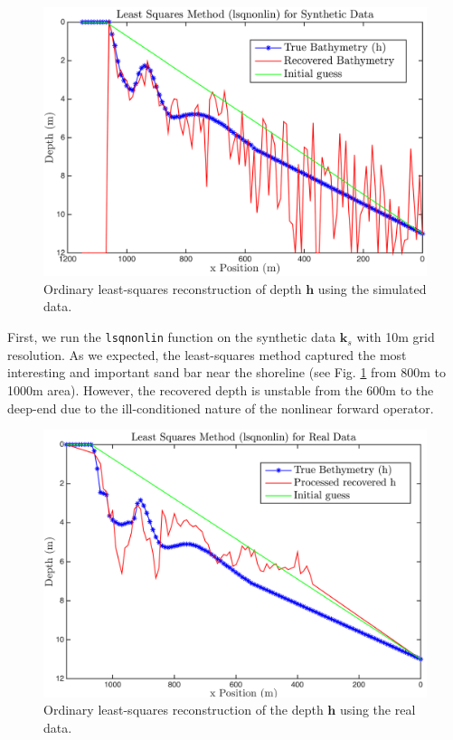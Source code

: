 \begin{figure}[H]
\center
\includegraphics[scale=0.6]{img/lsqnonlin_simulated_10m.png} %
\caption{Ordinary least-squares reconstruction of depth $\mathbf{h}$ using the simulated data.}
\label{lsqnonlin_simulated}
\end{figure}
First, we run the \verb|lsqnonlin| function on the synthetic data $\mathbf{k}_s$ with 10m grid resolution. As we expected, the least-squares method captured the most interesting and important sand bar near the shoreline (see Fig. \ref{lsqnonlin_simulated} from 800m to 1000m area). However, the recovered depth is unstable from the 600m to the deep-end due to the ill-conditioned nature of the nonlinear forward operator. 

\begin{figure}[H]
\center
\includegraphics[scale=0.6]{img/lsqnonlin_real_data_oct09.png} %
\caption{Ordinary least-squares reconstruction of the depth $\mathbf{h}$ using the real data.}
\label{lsqnonlin_real}
\end{figure}

